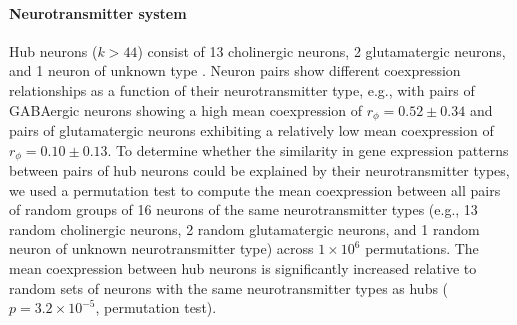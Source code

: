 \documentclass[10pt,letterpaper]{article}
\begin{document}




\paragraph{Neurotransmitter system}
Hub neurons ($k > 44$) consist of 13 cholinergic neurons, 2 glutamatergic neurons, and 1 neuron of unknown type \cite{Pereira:2015er}.
Neuron pairs show different coexpression relationships as a function of their neurotransmitter type, e.g., with pairs of GABAergic neurons showing a high mean coexpression of $r_\phi = 0.52 \pm 0.34$ and pairs of glutamatergic neurons exhibiting a relatively low mean coexpression of $r_\phi = 0.10 \pm 0.13$.
To determine whether the similarity in gene expression patterns between pairs of hub neurons could be explained by their neurotransmitter types, we used a permutation test to compute the mean coexpression between all pairs of random groups of 16 neurons of the same neurotransmitter types (e.g., 13 random cholinergic neurons, 2 random glutamatergic neurons, and 1 random neuron of unknown neurotransmitter type) across $1\times 10^6$ permutations.
The mean coexpression between hub neurons is significantly increased relative to random sets of neurons with the same neurotransmitter types as hubs ($p = 3.2\times 10^{-5}$, permutation test).
\end{document}
